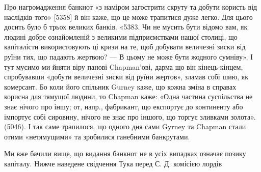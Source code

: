 Про нагромадження банкнот «з наміром загострити скруту та добути
користь від наслідків того» [5358] й він каже, що це може трапитися дуже
легко. Для цього досить було б трьох великих банків. «5383. Чи не мусить
бути відомо вам, як людині добре ознайомленій з великими підприємствами
нашої столиці, що капіталісти використовують ці кризи на те, щоб добувати
величезні зиски від руїни тих, що падають жертвою? — В цьому не може
бути жодного сумніву». І тут мусимо ми йняти віру панові Chapman’ові, дарма
що він кінець-кінцем, спробувавши «добути величезні зиски від руїни жертов»,
зламав собі шию, як комерсант. Бо коли його спільник Gurney каже, що кожна
зміна в справах корисна для тямущої людини, то Chapman каже: «Одна
частина суспільства не знає нічого про іншу; от, напр., фабрикант, що експортує
до континенту або імпортує собі сировину, нічого не знає про іншого,
що торгує зливками золота». (5046). І так саме трапилося, що одного дня
сами Gyrney та Chapman стали отими «нетямущими» та зробилися ганебними
банкрутами.

Ми вже бачили вище, що видання банкнот не в усіх випадках означає
позику капіталу. Нижче наведене свідчення Тука перед С. Д. комісією лордів
\parbreak{}  %
